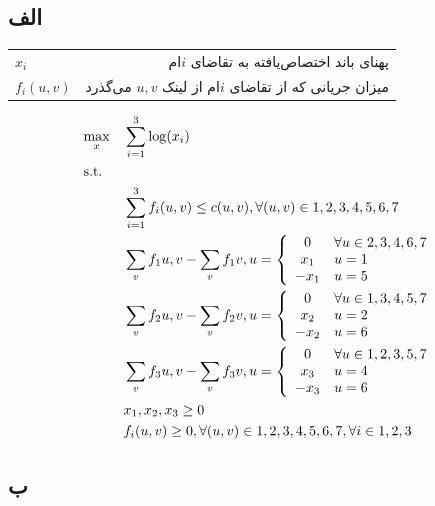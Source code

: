 \documentclass[paper=a4, fontsize=11pt]{article}
\numberwithin{equation}{section} %
\numberwithin{figure}{section} %
\numberwithin{table}{section} %
\begin{document}
\subsection{الف}
\begin{tabular}{l r}
	\(x_i\) & پهنای باند اختصاص‌یافته به تقاضای \(i\)ام\\
	\(f_i(u, v)\) & میزان جریانی که از تقاضای \(i\)ام از لینک \(u, v\) می‌گذرد\\
\end{tabular}
\begin{equation}
	\begin{aligned}
		& \underset{x}{\text{max}}
		& & \sum_{i=1}^{3} \log(x_i) \\
		& \text{s.t.} \\
		& & & \sum_{i=1}^{3} f_i(u, v) \le c(u, v), \forall (u, v) \in {1, 2, 3, 4, 5, 6, 7} \\
		& & & \sum_{v} f_1{u, v} - \sum_{v} f_1{v, u} = \left\{ \begin{array}{c l}
			0 & \forall u \in {2, 3, 4, 6, 7}\\
			x_1 & u = 1\\
			-x_1 & u = 5\\
		\end{array} \right.\\
		& & & \sum_{v} f_2{u, v} - \sum_{v} f_2{v, u} = \left\{ \begin{array}{c l}
			0 & \forall u \in {1, 3, 4, 5, 7}\\
			x_2 & u = 2\\
			-x_2 & u = 6\\
		\end{array} \right.\\
		& & & \sum_{v} f_3{u, v} - \sum_{v} f_3{v, u} = \left\{ \begin{array}{c l}
			0 & \forall u \in {1, 2, 3, 5, 7}\\
			x_3 & u = 4\\
			-x_3 & u = 6\\
		\end{array} \right.\\
		& & & x_1, x_2, x_3 \ge 0 \\
		& & & f_i(u, v) \ge 0, \forall (u, v) \in {1, 2, 3, 4, 5, 6, 7}, \forall i \in {1, 2, 3}
	\end{aligned}
\end{equation}

\subsection{ب}
\end{document}

